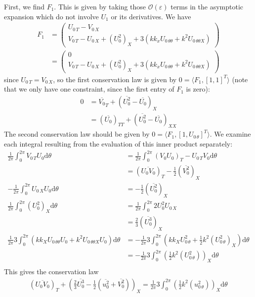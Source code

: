 \documentclass[12pt]{article}
\newcommand{\dd}[0]{\mathrm{d}}
\newcommand{\mc}[1]{\mathcal{#1}}
\numberwithin{equation}{section}
\begin{document}
First, we find $F_1$. This is given by taking those $\mc O(\varepsilon)$ terms in the asymptotic expansion which do not involve $U_1$ or its derivatives. We have 
\begin{align}
    F_1 &= \left(\begin{array}{c}
        U_{0 \, T} - V_{0\, X}   \\
        V_{0\, T} - U_{0\, X} + (U_0^2)_X + 3\left(kk_xU_{0\,\theta\theta} + k^2U_{0\,\theta\theta X}\right) 
    \end{array}\right) \nonumber\\
    &= \left(\begin{array}{c}
        0   \\
        V_{0\, T} - U_{0\, X} + (U_0^2)_X + 3\left(kk_xU_{0\,\theta\theta} + k^2U_{0\,\theta\theta X}\right) 
    \end{array}\right) \label{F1}
\end{align}
since $U_{0\,T} = V_{0\,X}$, so the first conservation law is given by $0 = \langle F_1,[1,1]^T \rangle$ (note that we only have one constraint, since the first entry of $F_1$ is zero):
\begin{align}
    0&= \overline{V_0}_T + \left(\overline{U_0^2}-\overline{U_0}\right)_X \nonumber\\
    &= \left(\overline{U_{0}}\right)_{TT} + \left(\overline{U_0^2}-\overline{U_0}\right)_{XX} 
\end{align}
The second conservation law should be given by $0 = \langle F_1,[1,U_{0\,\theta}]^T \rangle$. We examine each integral resulting from the evaluation of this inner product separately:
\begin{align*}
    \frac{1}{2\pi}\int_0^{2\pi}V_{0\, T}U_{0} \dd \theta &= \frac{1}{2\pi}\int_0^{2\pi}(V_0U_0)_T - U_{0\,T}V_0 \dd \theta \\
    &= (\overline{U_0V_0})_T - \frac{1}{2}\left(\overline{V_0^2}\right)_X \\
    -\frac{1}{2\pi}\int_0^{2\pi} U_{0\, X}U_0 \dd \theta &=-\frac{1}{2} \left(\overline{U_0^2}\right)_X \\
    \frac{1}{2\pi}\int_0^{2\pi} (U_0^2)_X \dd \theta &= \frac{1}{2\pi}\int_0^{2\pi}2U_0^2U_{0\, X} \\
    &= \frac{2}{3}\left(\overline{U_0^3}\right)_X \\
     \frac{1}{2\pi}3\int_0^{2\pi}(kk_XU_{0\, \theta \theta}U_{0} + k^2U_{0\, \theta \theta X}U_0)\dd \theta &= -\frac{1}{2\pi}3\int_0^{2\pi}\left(kk_XU_{0\, \theta}^2 +\frac{1}{2} k^{2}\left(U_{0\, \theta}^2\right)_X\right)\dd \theta \\
     &= -\frac{1}{2\pi}3\int_0^{2\pi}\left(\frac{1}{2} k^{2}\left(U_{0\, \theta}^2\right)\right)_X\dd \theta \\
\end{align*}
This gives the conservation law
\begin{align}
    (\overline{U_0V_0})_T + \left(\frac{2}{3}\overline{U_0^3} - \frac{1}{2}\left(\overline{u_0^2}+\overline{V_0^2}\right)\right)_X =\frac{1}{2\pi}3\int_0^{2\pi}\left(\frac{1}{2} k^{2}\left(u_{0\, \theta}^2\right)\right)_X\dd \theta
\end{align}
\end{document}
